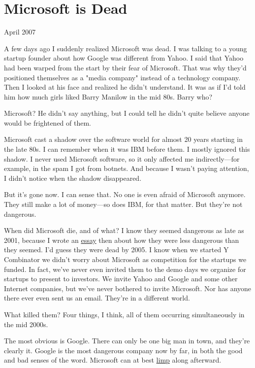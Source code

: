 \chapter{Microsoft is Dead}



April 2007

A few days ago I suddenly realized Microsoft was dead.  I was talking
to a young startup founder about how Google was different from
Yahoo.  I said that Yahoo had been warped from the start by
their fear of Microsoft.  That was why they'd positioned themselves
as a "media company" instead of a technology company.  Then I looked
at his face and realized he didn't understand.  It was as if I'd
told him how much girls liked Barry Manilow in the mid
80s.  Barry who?

Microsoft?  He didn't say anything, but I could tell he didn't quite
believe anyone would be frightened of them.

Microsoft cast
a shadow over the software world for almost 20 years
starting in the late 80s.
I can remember when it was IBM before them.  I mostly ignored this
shadow.  I never used Microsoft software, so it only affected me
indirectly---for example, in the spam I got from botnets.  And
because I wasn't paying attention, I didn't notice when the shadow
disappeared.

But it's gone now.  I can sense that.  No one is even afraid of
Microsoft anymore.  They still make a lot of money---so does IBM,
for that matter.  But they're not dangerous.

When did Microsoft die, and of what?  I know they seemed dangerous
as late as 2001, because I wrote an \href{http://www.paulgraham.com/road.html}{essay} then 
about how they were
less dangerous than they seemed.   I'd guess they were dead by 2005.
I know when we started Y Combinator we didn't worry about Microsoft
as competition for the startups we funded.  In fact, we've never
even invited them to the demo days we organize for startups to
present to investors.  We invite Yahoo and Google and some other
Internet companies, but we've never bothered to invite Microsoft.
Nor has anyone there ever even sent us an email.  They're in a
different world.

What killed them?  Four things, I think, all of them occurring
simultaneously in the mid 2000s.

The most obvious is Google.  There can only be one big man in town,
and they're clearly it.  Google is the most dangerous company
now by far, in both the good and bad senses of the word.  Microsoft
can at best \href{http://live.com}{limp} along afterward.

